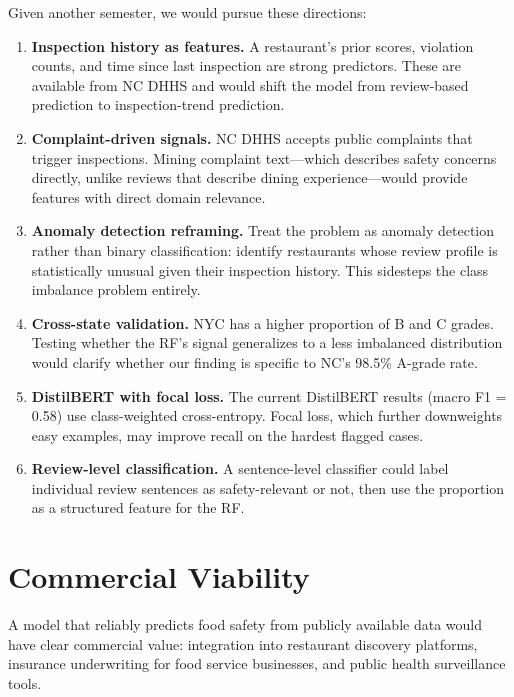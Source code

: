 \documentclass{article}
\begin{document}
Given another semester, we would pursue these directions:

\begin{enumerate}
    \item \textbf{Inspection history as features.} A restaurant's prior scores, violation counts, and time since last inspection are strong predictors. These are available from NC DHHS and would shift the model from review-based prediction to inspection-trend prediction.

    \item \textbf{Complaint-driven signals.} NC DHHS accepts public complaints that trigger inspections. Mining complaint text---which describes safety concerns directly, unlike reviews that describe dining experience---would provide features with direct domain relevance.

    \item \textbf{Anomaly detection reframing.} Treat the problem as anomaly detection rather than binary classification: identify restaurants whose review profile is statistically unusual given their inspection history. This sidesteps the class imbalance problem entirely.

    \item \textbf{Cross-state validation.} NYC has a higher proportion of B and C grades. Testing whether the RF's signal generalizes to a less imbalanced distribution would clarify whether our finding is specific to NC's 98.5\% A-grade rate.

    \item \textbf{DistilBERT with focal loss.} The current DistilBERT results (macro F1 = 0.58) use class-weighted cross-entropy. Focal loss, which further downweights easy examples, may improve recall on the hardest flagged cases.

    \item \textbf{Review-level classification.} A sentence-level classifier could label individual review sentences as safety-relevant or not, then use the proportion as a structured feature for the RF.
\end{enumerate}

\section{Commercial Viability}

A model that reliably predicts food safety from publicly available data would have clear commercial value: integration into restaurant discovery platforms, insurance underwriting for food service businesses, and public health surveillance tools.
\end{document}
